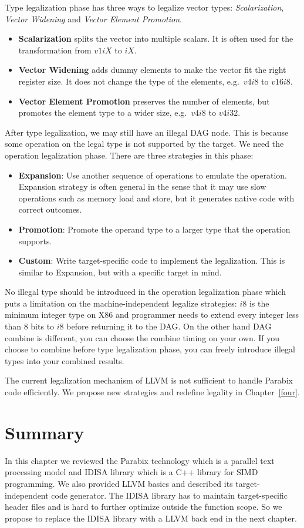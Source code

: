 Type legalization phase has three ways to legalize vector types\cite{hybrid_simd_type_legalize}: \textit{Scalarization}, \textit{Vector Widening} and \textit{Vector Element Promotion}.

\begin{itemize}
    \item \textbf{Scalarization} splits the vector into multiple scalars. It is often used for the transformation from $v1iX$ to $iX$.
    \item \textbf{Vector Widening} adds dummy elements to make the vector fit the right register size. It does not change the type of the elements, e.g.\ $v4i8$ to $v16i8$.
    \item \textbf{Vector Element Promotion} preserves the number of elements, but promotes the element type to a wider size, e.g.\ $v4i8$ to $v4i32$.
\end{itemize}

After type legalization, we may still have an illegal DAG node. This is because some operation on the legal type is not supported by the target. We need the operation legalization phase. There are three strategies in this phase:

\begin{itemize}
    \item \textbf{Expansion}: Use another sequence of operations to emulate the operation. Expansion strategy is often general in the sense that it may use slow operations such as memory load and store, but it generates native code with correct outcomes.
    \item \textbf{Promotion}: Promote the operand type to a larger type that the operation supports.
    \item \textbf{Custom}: Write target-specific code to implement the legalization. This is similar to Expansion, but with a specific target in mind.
\end{itemize}

No illegal type should be introduced in the operation legalization phase which puts a limitation on the machine-independent legalize strategies: $i8$ is the minimum integer type on X86 and programmer needs to extend every integer less than 8 bits to $i8$ before returning it to the DAG\@. On the other hand DAG combine is different, you can choose the combine timing on your own. If you choose to combine before type legalization phase, you can freely introduce illegal types into your combined results.

The current legalization mechanism of LLVM is not sufficient to handle Parabix code efficiently. We propose new strategies and redefine legality in Chapter~\ref{four}.

\section{Summary}
In this chapter we reviewed the Parabix technology which is a parallel text processing model and IDISA library which is a C++ library for SIMD programming. We also provided LLVM basics and described its target-independent code generator. The IDISA library has to maintain target-specific header files and is hard to further optimize outside the function scope. So we propose to replace the IDISA library with a LLVM back end in the next chapter.
